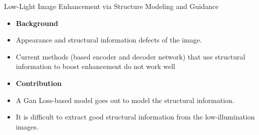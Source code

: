 \documentclass[CJK,aspectratio=169]{beamer}  %
\begin{document}
	\begin{frame}
		
		Low-Light Image Enhancement via Structure Modeling and Guidance\textcolor{blue}{\citep{xu2023low}}
		
		\begin{itemize} 
			\item \textbf{Background}
			
			\item[\checkmark] Appearance and structural information defects of the image.
				
			\vspace{.3cm}
			\item[\checkmark] Current methods (based encoder and decoder network) \textcolor{blue}{\citep{rana2021edge}}\textcolor{blue}{\citep{zhu2020eemefn}} that use structural information to boost enhancement do not work well 
			
			
		\end{itemize}
		
		\begin{itemize}
			\item \textbf{Contribution}
			
			\item[\checkmark] A Gan Loss-based model goes out to model the structural information.
			
			\vspace{.3cm}
			\item[\checkmark] It is difficult to extract good structural information from the low-illumination images.
			
		\end{itemize}	
		
	\end{frame}
	
\end{document}
